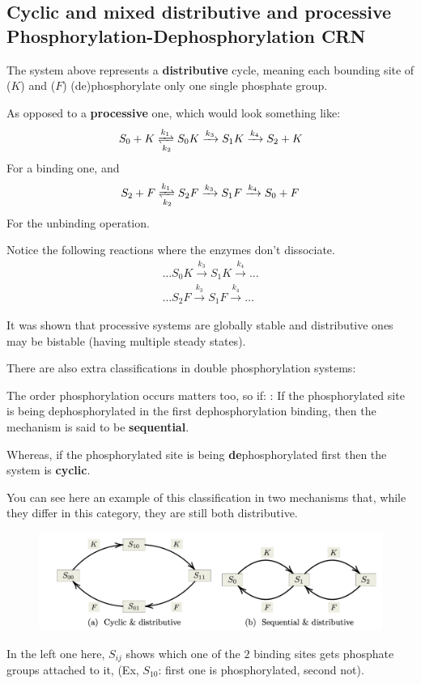 \subsection{Cyclic and mixed distributive and processive Phosphorylation-Dephosphorylation CRN}
The system above represents a \textbf{distributive} cycle, meaning each bounding site of ($K$) and ($F$) (de)phosphorylate only one single phosphate group.

As opposed to a \textbf{processive} one, which would look something like:
\begin{equation*}
	S_0 + K \xrightleftharpoons[k_2]{k_1} S_0 K \xrightarrow{k_3} S_1 K \xrightarrow{k_4} S_2 + K
\end{equation*}
For a binding one, and
\begin{equation*}
	S_2 + F \xrightleftharpoons[k_2]{k_1} S_2 F \xrightarrow{k_3} S_1 F \xrightarrow{k_4} S_0 + F
\end{equation*}
For the unbinding operation.

Notice the following reactions where the enzymes don't dissociate.
\begin{gather*}
	\ldots S_0 K \xrightarrow{k_3} S_1 K \xrightarrow{k_4} \ldots \\
	\ldots S_2 F \xrightarrow{k_3} S_1 F \xrightarrow{k_4} \ldots	
\end{gather*}

It was shown that processive systems are globally stable and distributive ones may be bistable (having multiple steady states).

There are also extra classifications in double phosphorylation systems:

The order phosphorylation occurs matters too, so if:
: If the  phosphorylated site is being dephosphorylated in the first dephosphorylation binding, then the mechanism is said to be \textbf{sequential}.

 Whereas, if the  phosphorylated site is being \textbf{de}phosphorylated first then the system is \textbf{cyclic}.

You can see here an example of this classification in two mechanisms that, while they differ in this category, they are still both distributive.
\begin{figure}[H]	
	\includegraphics[width=13cm]{math_pics/cyclic-vs-sequential.png}\label{cyclic_vs_sequential_figure}
	\centering
\end{figure}
In the left one here, $S_{ij}$ shows which one of the $2$ binding sites gets phosphate groups attached to it, (Ex, $S_{10}$: first one is phosphorylated, second not).

